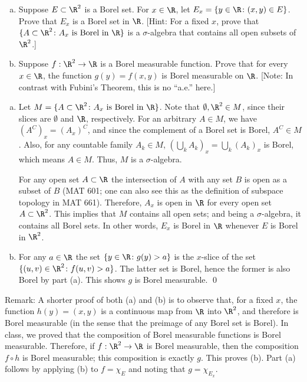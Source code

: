 \begin{hwsol} \hfill
\begin{enumerate}[(a)]
\item Suppose $E \subset \R^2$ is a Borel set. For $x \in \R$, let $E_x = \{y \in \R \colon (x, y) \in E \}$. Prove that $E_x$ is a Borel set in $\R$. [Hint: For a fixed $x$, prove that $\{ A \subset \R^2 \colon A_x \text{ is Borel in } \R \}$ is a $\sigma$-algebra that contains all open subsets of $\R^2$.]
\item Suppose $f: \R^{2} \to \R$ is a Borel measurable function. Prove that for every $x \in \R$, the function $g(y)= f(x, y)$ is Borel measurable on $\R$. [Note: In contrast with Fubini's Theorem, this is no ``a.e.'' here.] \\
\end{enumerate} 

\pf \hfill
\begin{enumerate}[(a)]
\item Let $M= \{ A \subset \R^2 \colon A_x \text{ is Borel in } \R \}$. Note that $\emptyset ,  \R^2 \in M$, since their slices are $\emptyset$ and $\R$, respectively. For an arbitrary $A \in M$, we have $(A^C)_x= (A_x)^C$, and since the complement of a Borel set is Borel, $A^C \in M$. Also, for any countable family $A_k \in M$, $(\bigcup_k A_k)_x= \bigcup_k (A_k)_x$ is Borel, which means $A \in M$. Thus, $M$ is a $\sigma$-algebra.    

For any open set $A \subset \R$ the intersection of $A$ with any set $B$ is open as a subset of $B$ (MAT 601; one can also see this as the definition of subspace topology in MAT 661). Therefore, $A_x$ is open in $\R$ for every open set $A \subset \R^2$. This implies that $M$ contains all open sets; and being a $\sigma$-algebra, it contains all Borel sets. In other words, $E_x$ is Borel in $\R$ whenever $E$ is Borel in $\R^2$.  

\item For any $a \in \R$ the set $\{ y \in \R \colon g(y) > a \}$ is the $x$-slice of the set $\{ (u, v) \in \R^2 \colon f(u, v) > a \}$. The latter set is Borel, hence the former is also Borel by part (a). This shows $g$ is Borel measurable. \qed \\
\end{enumerate}

\noindent Remark: A shorter proof of both (a) and (b) is to observe that, for a fixed $x$, the function $h(y)= (x, y)$ is a continuous map from $\R$ into $\R^2$, and therefore is Borel measurable (in the sense that the preimage of any Borel set is Borel). In class, we proved that the composition of Borel measurable functions is Borel measurable.  Therefore, if $f: \R^2 \to \R$ is Borel measurable, then the composition $f \circ h$ is Borel measurable; this composition is exactly $g$. This  proves (b). Part (a) follows by applying (b) to $f= \chi_E$ and noting that $g= \chi_{E_x}$. \\
\end{hwsol}


